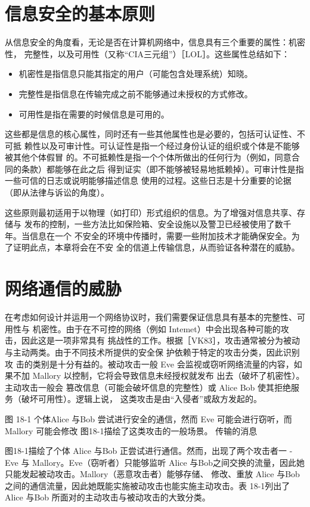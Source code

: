 \section{信息安全的基本原则}
从信息安全的角度看，无论是否在计算机网络中，信息具有三个重要的属性：机密性，
完整性，以及可用性（又称“CIA三元组”）［LOL］。这些属性总结如下：
\begin{itemize}
    \item 机密性是指信息只能其指定的用户（可能包含处理系统）知晓。
    \item 完整性是指信息在传输完成之前不能够通过未授权的方式修改。
    \item 可用性是指在需要的时候信息是可用的。
\end{itemize}

这些都是信息的核心属性，同时还有一些其他属性也是必要的，包括可认证性、不可抵
赖性以及可审计性。可认证性是指一个经过身份认证的组织或个体是不能够被其他个体假冒
的。不可抵赖性是指一个个体所做出的任何行为（例如，同意合同的条款）都能够在此之后
得到证实（即不能够被轻易地抵赖掉）。可审计性是指一些可信的日志或说明能够描述信息
使用的过程。这些日志是十分重要的论据（即从法律与诉讼的角度）。

这些原则最初适用于以物理（如打印）形式组织的信息。为了增强对信息共享、存储与
发布的控制，一些方法比如保险箱、安全设施以及警卫已经被使用了数千年。当信息在一个
不安全的环境中传播时，需要一些附加技术才能确保安全。为了证明此点，本章将会在不安
全的信道上传输信息，从而验证各种潜在的威胁。

\section{网络通信的威胁}
在考虑如何设计并运用一个网络协议时，我们需要保证信息具有基本的完整性、可用性与
机密性。由于在不可控的网络（例如 Intemet）中会出现各种可能的攻击，因此这是一项非常具有
挑战性的工作。根据［VK83］，攻击通常被分为被动与主动两类。由于不同技术所提供的安全保
护依赖于特定的攻击分类，因此识别攻
击的类别是十分有益的。被动攻击一般
Eve
会监视或窃听网络流量的内容，如果不加
Mallory
以控制，它将会导致信息未经授权就发布
出去（破坏了机密性）。主动攻击一般会
篡改信息（可能会破坏信息的完整性）或
Alice
Bob
使其拒绝服务（破坏可用性）。逻辑上说，
这类攻击是由“入侵者”或敌方发起的。

图 18-1 个体Alice 与Bob 尝试进行安全的通信，然而
Eve 可能会进行窃听，而Mallory 可能会修改
图18-1描绘了这类攻击的一般场景。
传输的消息

图18-1描绘了个体 Alice 与Bob
正尝试进行通信。然而，出现了两个攻击者一
-Eve 与 Mallory。Eve（窃听者）只能够监听
Alice 与Bob之间交换的流量，因此她只能发起被动攻击。Mallory（恶意攻击者）能够存储、
修改、重放 Alice 与Bob 之间的通信流量，因此她既能实施被动攻击也能实施主动攻击。表
18-1列出了 Alice 与Bob 所面对的主动攻击与被动攻击的大致分类。


